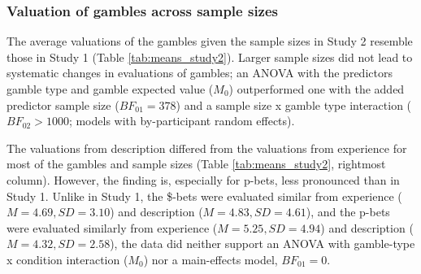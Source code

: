\documentclass[
  a4paper, man, floatsintext]{apa6}
\author{Jana B. Jarecki}
\date{11 Mai, 2020}
\begin{document}
\subsubsection{Valuation of gambles across sample sizes}

The average valuations of the gambles given the sample sizes in Study 2
resemble those in Study 1 (Table \ref{tab:means_study2}). Larger sample
sizes did not lead to systematic changes in evaluations of gambles; an
ANOVA with the predictors gamble type and gamble expected value
(\(M_0\)) outperformed one with the added predictor sample size
(\(BF_{01} = 378\)) and a sample size x gamble type interaction
(\(BF_{02} > 1000\); models with by-participant random effects).

The valuations
from description differed from the valuations from experience for most
of the gambles and sample sizes (Table \ref{tab:means_study2}, rightmost
column). However, the finding is, especially for p-bets, less pronounced
than in Study 1. Unlike in Study 1, the \$-bets were evaluated similar
from experience (\(M=4.69, SD=3.10\)) and description
(\(M=4.83, SD=4.61\)), and the p-bets were evaluated similarly from
experience (\(M=5.25, SD=4.94\)) and description (\(M=4.32, SD=2.58\)),
the data did neither support an ANOVA with gamble-type x condition
interaction (\(M_0\)) nor a main-effects model, \(BF_{01} = 0\).
\end{document}
